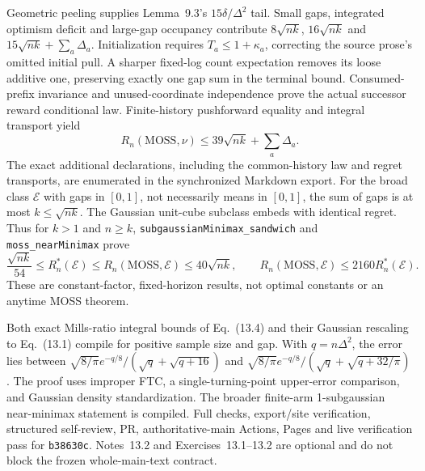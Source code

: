 Geometric peeling supplies Lemma~9.3's $15\delta/\Delta^2$ tail.
Small gaps, integrated optimism deficit and large-gap occupancy contribute
$8\sqrt{nk}$, $16\sqrt{nk}$ and $15\sqrt{nk}+\sum_a\Delta_a$.
Initialization requires $T_a\le1+\kappa_a$, correcting the source prose's
omitted initial pull. A sharper fixed-log count expectation removes its
loose additive one, preserving exactly one gap sum in the terminal bound.
Consumed-prefix invariance and unused-coordinate independence prove the
actual successor reward conditional law. Finite-history pushforward
equality and integral transport yield
\[
 R_n(\mathrm{MOSS},\nu)\le39\sqrt{nk}+\sum_a\Delta_a.
\]
The exact additional declarations, including the common-history law and
regret transports, are enumerated in the synchronized Markdown export.
For the broad class $\mathcal E$ with gaps in $[0,1]$, not necessarily
means in $[0,1]$, the sum of gaps is at most $k\le\sqrt{nk}$.
The Gaussian unit-cube subclass embeds with identical regret. Thus for
$k>1$ and $n\ge k$, \texttt{subgaussianMinimax\_sandwich} and
\texttt{moss\_nearMinimax} prove
\[
 \frac{\sqrt{nk}}{54}\le R_n^*(\mathcal E)
 \le R_n(\mathrm{MOSS},\mathcal E)\le40\sqrt{nk},\qquad
 R_n(\mathrm{MOSS},\mathcal E)\le2160R_n^*(\mathcal E).
\]
These are constant-factor, fixed-horizon results, not optimal constants or
an anytime MOSS theorem.

Both exact Mills-ratio integral bounds of Eq.~(13.4) and their Gaussian
rescaling to Eq.~(13.1) compile for positive sample size and gap.
With $q=n\Delta^2$, the error lies between
$\sqrt{8/\pi}e^{-q/8}/(\sqrt q+\sqrt{q+16})$ and
$\sqrt{8/\pi}e^{-q/8}/(\sqrt q+\sqrt{q+32/\pi})$.
The proof uses improper FTC, a single-turning-point upper-error comparison,
and Gaussian density standardization. The broader finite-arm
1-subgaussian near-minimax statement is compiled. Full checks,
export/site verification, structured self-review, PR, authoritative-main
Actions, Pages and live verification pass for \texttt{b38630c}.
Notes~13.2 and Exercises~13.1--13.2 are optional and do not block the
frozen whole-main-text contract.
